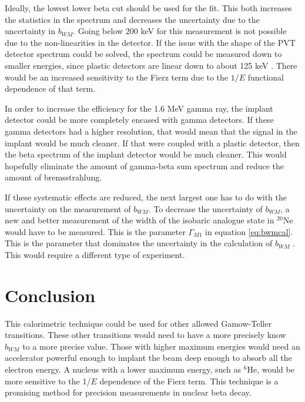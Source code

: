 \documentclass[../MaxHughesThesis.tex]{subfiles}
\begin{document}
Ideally, the lowest lower beta cut should be used for the fit.
This both increases the statistics in the spectrum and decreases the uncertainty due to the uncertainty in $b_{WM}$.
Going below $200$ keV for this measurement is not possible due to the non-linearities in the detector.
If the issue with the shape of the PVT detector spectrum could be solved, the spectrum could be measured down to smaller energies, since plastic detectors are linear down to about 125 keV \cite{Kno10}. 
There would be an increased sensitivity to the Fierz term due to the $1/E$ functional dependence of that term.

In order to increase the efficiency for the 1.6 MeV gamma ray, the implant detector could be more completely encased with gamma detectors.
If these gamma detectors had a higher resolution, that would mean that the signal in the implant would be much cleaner.
If that were coupled with a plastic detector, then the beta spectrum of the implant detector would be much cleaner.
This would hopefully eliminate the amount of gamma-beta sum spectrum and reduce the amount of bremsstrahlung.

If these systematic effects are reduced, the next largest one has to do with the uncertainty on the measurement of $b_{WM}$.
To decrease the uncertainty of $b_{WM}$,  a new and better measurement of the width of the isobaric analogue state in $^{20}$Ne would have to be measured.
This is the parameter $\Gamma_{M1}$ in equation \ref{eq:bwmcal}.
This is the parameter that dominates the uncertainty in  the calculation of $b_{WM}$ \cite{Min11}.
This would require a different type of experiment.

\section{Conclusion}
This calorimetric technique could be used for other allowed Gamow-Teller transitions.
These other transitions would need to have a more precisely know $b_{WM}$ to a more precise value.
Those with higher maximum energies would need an accelerator powerful enough to implant the beam deep enough to absorb all the electron energy.
A nucleus with a lower maximum energy, such as $^{6}$He, would be more sensitive to the 1/$E$ dependence of the Fierz term. 
This technique is a promising method for precision measurements in nuclear beta decay.
\end{document}
